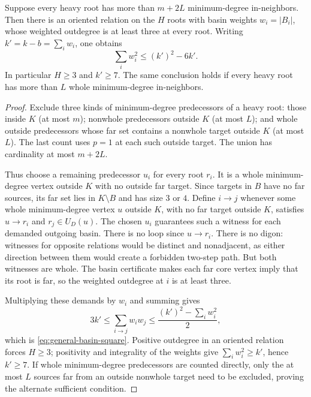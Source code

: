 \begin{theorem}
\label{thm:general-good-witnesses}
Suppose every heavy root has more than $m+2L$ minimum-degree
in-neighbors.  Then there is an oriented relation on the $H$ roots
with basin weights $w_i=|B_i|$, whose weighted outdegree is at least
three at every root.  Writing $k'=k-b=\sum_iw_i$, one obtains
\begin{equation}\label{eq:general-basin-square}
 {\sum_iw_i^2\le(k')^2-6k'.}
\end{equation}
In particular $H\ge3$ and $k'\ge7$.
The same conclusion holds if every heavy root has more than $L$
whole minimum-degree in-neighbors.
\end{theorem}
\begin{proof}
Exclude three kinds of minimum-degree predecessors of a heavy
root: those inside $K$ (at most $m$); nonwhole predecessors
outside $K$ (at most $L$); and whole outside predecessors whose
far set contains a nonwhole target outside $K$ (at most $L$).
The last count uses $p=1$ at each such outside target.
The union has cardinality at most $m+2L$.

Thus choose a remaining predecessor $u_i$ for every root $r_i$.
It is a whole minimum-degree vertex outside $K$ with no outside
far target.  Since targets in $B$ have no far sources, its far
set lies in $K\setminus B$ and has size $3$ or $4$.
Define $i\to j$ whenever some whole minimum-degree vertex $u$ outside
$K$, with no far target outside $K$, satisfies $u\to r_i$ and
$r_j\in U_D(u)$.  The chosen $u_i$ guarantees such a witness for
each demanded outgoing basin.  There is no loop since $u\to r_i$.
There is no digon: witnesses for opposite relations would be
distinct and nonadjacent, as either direction between them would
create a forbidden two-step path.  But both witnesses are whole.
The basin certificate makes each far core vertex imply that its
root is far, so the weighted outdegree at $i$ is at least three.

Multiplying these demands by $w_i$ and summing gives
\[
 3k'\le\sum_{i\to j}w_iw_j
       \le\frac{(k')^2-\sum_iw_i^2}{2},
\]
which is \eqref{eq:general-basin-square}.
Positive outdegree in an oriented relation forces $H\ge3$;
positivity and integrality of the weights give
$\sum_iw_i^2\ge k'$, hence $k'\ge7$.
If whole minimum-degree predecessors are counted directly,
only the at most $L$ sources far from an outside nonwhole target
need to be excluded, proving the alternate sufficient condition.
\end{proof}


